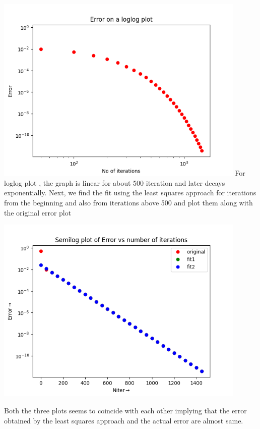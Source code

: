 \documentclass[10pt,a4paper]{article}
\begin{document}
\includegraphics[width = 0.9\textwidth]{3.png}
\newline
For loglog plot , the graph is linear for about 500 iteration and later decays exponentially.
\newline
Next, we find the fit using the least squares approach for iterations from the beginning and also from iterations above 500 and plot them along with the original error plot

\includegraphics[width = 0.9\textwidth]{4.png}

Both the three plots seems to coincide with each other implying that the error obtained by the least squares approach and the actual error are almost same.
\newline \newline \newline \newline \newline
\end{document}
